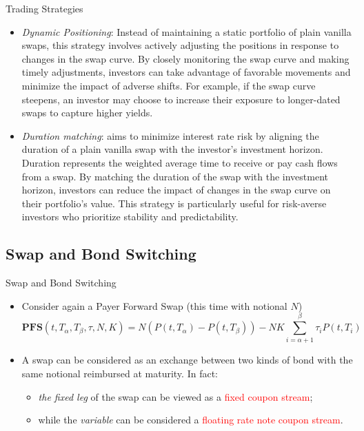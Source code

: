 \documentclass{beamer}
\begin{document}
\begin{frame}{Trading Strategies}
	\begin{itemize}
\item \emph{Dynamic Positioning}: Instead of maintaining a static portfolio of plain vanilla swaps, this strategy involves actively adjusting the positions in response to changes in the swap curve. By closely monitoring the swap curve and making timely adjustments, investors can take advantage of favorable movements and minimize the impact of adverse shifts. For example, if the swap curve steepens, an investor may choose to increase their exposure to longer-dated swaps to capture higher yields.
\item \emph{Duration matching}: aims to minimize interest rate risk by aligning the duration of a plain vanilla swap with the investor's investment horizon. Duration represents the weighted average time to receive or pay cash flows from a swap. By matching the duration of the swap with the investment horizon, investors can reduce the impact of changes in the swap curve on their portfolio's value. This strategy is particularly useful for risk-averse investors who prioritize stability and predictability.
\end{itemize}
\end{frame}

\subsection{Swap and Bond Switching}
\begin{frame}{Swap and Bond Switching}
	\begin{itemize}
		\item<1-> Consider again a Payer Forward Swap (this time with notional $N$)
		\begin{equation*}
			\textbf{PFS}(t,T_\alpha,T_\beta,\tau,N,K)=N(P(t,T_\alpha)-P(t,T_\beta))-NK\sum_{i=\alpha+1}^{\beta} \tau_iP(t,T_i)
		\end{equation*}
		\item<2-> A swap can be considered as an exchange between two kinds of bond with the same notional reimbursed at maturity. In fact:
		\begin{itemize}
		 \item<3->\emph{the fixed leg} of the swap can be viewed as a \textcolor{red}{fixed coupon stream};
		 \item<3-> while the \emph{variable} can be considered a \textcolor{red}{floating rate note coupon stream}. 
		\end{itemize}
	\end{itemize}
\end{frame}
\end{document}
